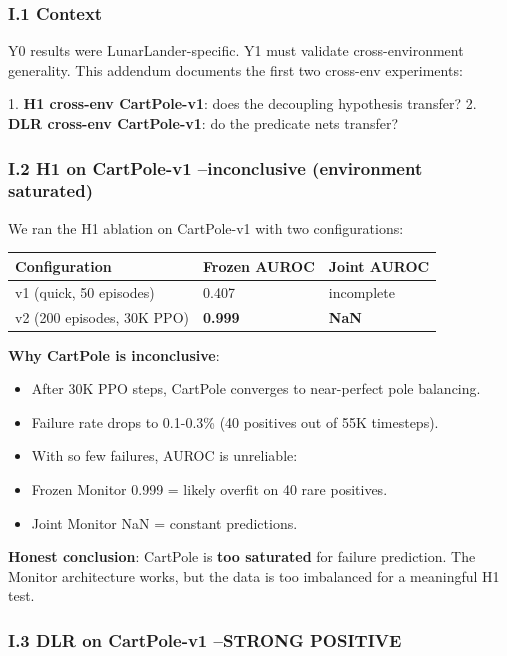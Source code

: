\documentclass[11pt]{article}
\begin{document}
\subsubsection{I.1 Context}

Y0 results were LunarLander-specific. Y1 must validate cross-environment
generality. This addendum documents the first two cross-env experiments:

1. \textbf{H1 cross-env CartPole-v1}: does the decoupling hypothesis transfer?
2. \textbf{DLR cross-env CartPole-v1}: do the predicate nets transfer?

\subsubsection{I.2 H1 on CartPole-v1 --inconclusive (environment saturated)}

We ran the H1 ablation on CartPole-v1 with two configurations:

\begin{tabular}{lll}
Configuration & Frozen AUROC & Joint AUROC \\
\hline
v1 (quick, 50 episodes) & 0.407 & incomplete \\
v2 (200 episodes, 30K PPO) & \textbf{0.999} & \textbf{NaN} \\
\end{tabular}


\textbf{Why CartPole is inconclusive}:
\begin{itemize}
  \item After 30K PPO steps, CartPole converges to near-perfect pole balancing.
  \item Failure rate drops to 0.1-0.3\% (40 positives out of 55K timesteps).
  \item With so few failures, AUROC is unreliable:
  \item Frozen Monitor 0.999 = likely overfit on 40 rare positives.
  \item Joint Monitor NaN = constant predictions.
\end{itemize}


\textbf{Honest conclusion}: CartPole is \textbf{too saturated} for failure prediction.
The Monitor architecture works, but the data is too imbalanced for a
meaningful H1 test.

\subsubsection{I.3 DLR on CartPole-v1 --STRONG POSITIVE}
\end{document}
